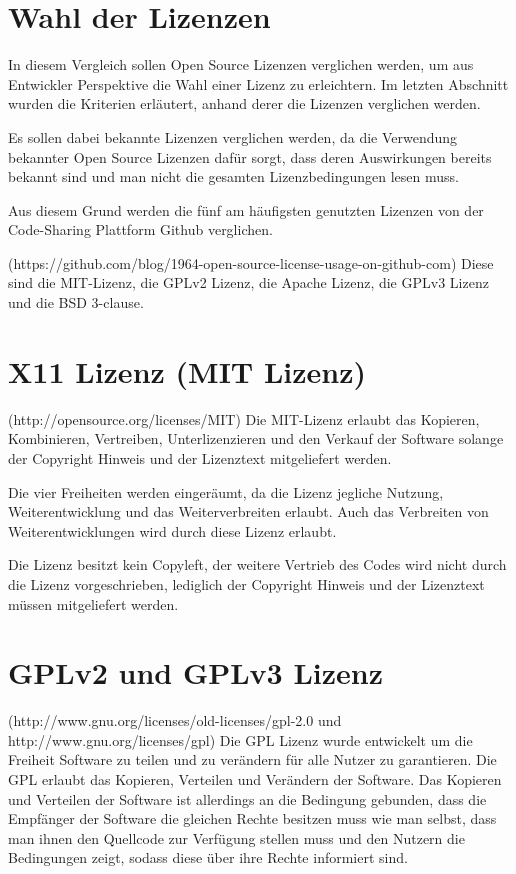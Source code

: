 \section{Wahl der Lizenzen}
In diesem Vergleich sollen Open Source Lizenzen verglichen werden, um aus Entwickler Perspektive die Wahl einer Lizenz zu erleichtern. Im letzten Abschnitt wurden die Kriterien erl\"autert, anhand derer die Lizenzen verglichen werden. 

Es sollen dabei bekannte Lizenzen verglichen werden, da die Verwendung bekannter Open Source Lizenzen daf\"ur sorgt, dass deren Auswirkungen bereits bekannt sind und man nicht die gesamten Lizenzbedingungen lesen muss. 

Aus diesem Grund werden die f\"unf am h\"aufigsten genutzten Lizenzen von der Code-Sharing Plattform Github verglichen. 

(https://github.com/blog/1964-open-source-license-usage-on-github-com) Diese sind die MIT-Lizenz, die GPLv2 Lizenz, die Apache Lizenz, die GPLv3 Lizenz und die BSD 3-clause. 

\section{X11 Lizenz (MIT Lizenz)}

(http://opensource.org/licenses/MIT) Die MIT-Lizenz erlaubt das Kopieren, Kombinieren, Vertreiben, Unterlizenzieren und den Verkauf der Software solange der Copyright Hinweis und der Lizenztext mitgeliefert werden. 

Die vier Freiheiten werden einger\"aumt, da die Lizenz jegliche Nutzung, Weiterentwicklung und das Weiterverbreiten erlaubt. Auch das Verbreiten von Weiterentwicklungen wird durch diese Lizenz erlaubt. 

Die Lizenz besitzt kein Copyleft, der weitere Vertrieb des Codes wird nicht durch die Lizenz vorgeschrieben, lediglich der Copyright Hinweis und der Lizenztext m\"ussen mitgeliefert werden. 

\section{GPLv2 und GPLv3 Lizenz}

(http://www.gnu.org/licenses/old-licenses/gpl-2.0 und http://www.gnu.org/licenses/gpl) Die GPL Lizenz wurde entwickelt um die Freiheit Software zu teilen und zu ver\"andern f\"ur alle Nutzer zu garantieren. Die GPL erlaubt das Kopieren, Verteilen und Ver\"andern der Software. Das Kopieren und Verteilen der Software ist allerdings an die Bedingung gebunden, dass die Empf\"anger der Software die gleichen Rechte besitzen muss wie man selbst, dass man ihnen den Quellcode zur Verf\"ugung stellen muss und den Nutzern die Bedingungen zeigt, sodass diese \"uber ihre Rechte informiert sind. 

